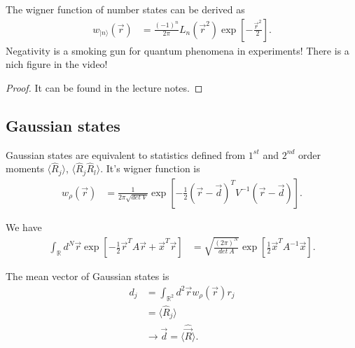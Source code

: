 \documentclass[../../note.tex]{subfiles}
\begin{document}
\begin{example}
    The wigner function of number states can be derived as
    \begin{align}
        w_{\vert n \rangle}(\overrightarrow{r}) 
        &= \frac{(-1)^n}{2 \pi} L_n(\overrightarrow{r}^2) \exp\left[- \frac{\overrightarrow{r}^2}{2}\right].
    \end{align}
    Negativity is a smoking gun for quantum phenomena in experiments! There is a nich figure in the video!
\end{example}
\begin{proof}
    It can be found in the lecture notes.
\end{proof}

\subsection{Gaussian states}
\begin{definition}
    Gaussian states are equivalent to statistics defined from $1^{st}$ and $2^{nd}$ order moments $\langle \hat{R}_j \rangle$, $\langle \hat{R}_j \hat{R}_l \rangle$. It's wigner function is
    \begin{align}
        w_{\rho}(\overrightarrow{r})
        &= \frac{1}{2 \pi \sqrt{det~V}} \exp\left[-\frac{1}{2} (\overrightarrow{r} - \overrightarrow{d})^T V^{-1} (\overrightarrow{r} - \overrightarrow{d})\right].
    \end{align}
\end{definition}

\begin{theorem}
    We have
    \begin{align}
        \int_{\mathbb{R}} d^N \overrightarrow{r} \exp\left[- \frac{1}{2} \overrightarrow{r}^T A \overrightarrow{r} + \overrightarrow{x}^T \overrightarrow{r}\right] 
        &= \sqrt{\frac{(2 \pi)^N}{det~A}} \exp\left[\frac{1}{2} \overrightarrow{x}^T A^{-1} \overrightarrow{x}\right].
    \end{align}
\end{theorem}

\begin{lemma}
    The mean vector of Gaussian states is
    \begin{align}
        d_j 
        &= \int_{\mathbb{R}^2} d^2 \overrightarrow{r} w_{\rho}(\overrightarrow{r}) r_j \\
        &= \langle \hat{R}_j \rangle \\
        &\longrightarrow \overrightarrow{d} = \langle \hat{\overrightarrow{R}} \rangle.
    \end{align}
\end{lemma}
\end{document}
